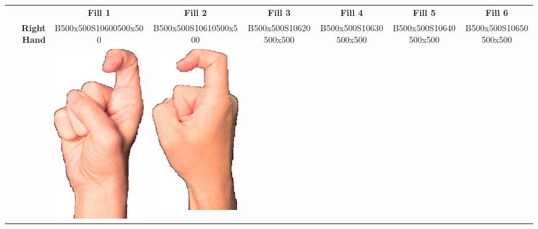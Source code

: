 \documentclass{article}
\begin{document}
\begin{center}
\begin{tabular}{r*{6}{c}}
&\textbf{Fill 1}&\textbf{Fill 2}&\textbf{Fill 3}&\textbf{Fill 4}&\textbf{Fill 5}&\textbf{Fill 6}\\
\multirow{2}{*}{\textbf{Right Hand}}&
B500x500S10600500x500&
B500x500S10610500x500&
B500x500S10620500x500&
B500x500S10630500x500&
B500x500S10640500x500&
B500x500S10650500x500\\
&
\includegraphics[scale=0.1]{images/01-04-1.jpg}&
\includegraphics[scale=0.1]{images/01-04-2.jpg}&

\end{tabular}
\end{center}
\end{document}
